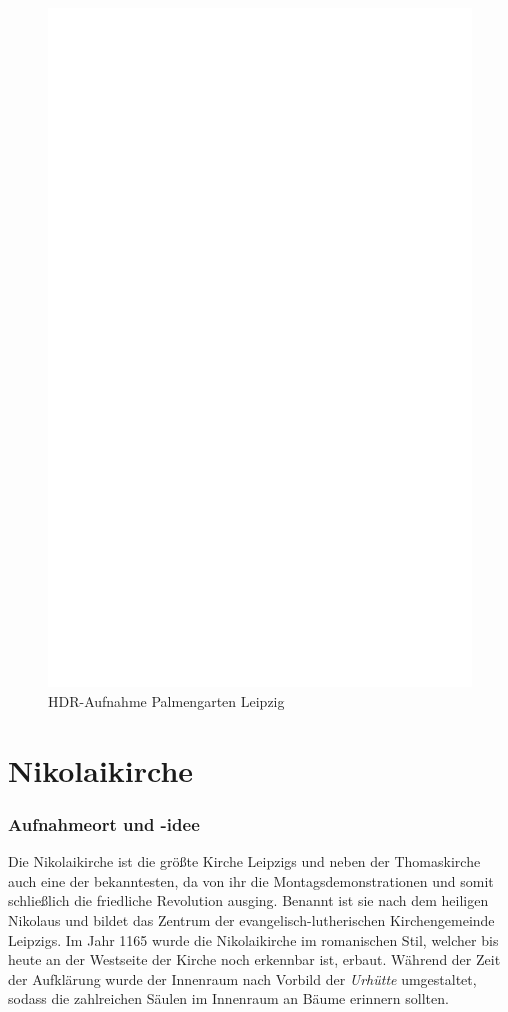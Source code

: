 \documentclass[liststotoc,bibtotoc,fontsize=14pt,]{scrreprt}
\begin{document}
\newpage
\begin{figure}[h]
	\includegraphics[width=\linewidth]{img/ph.jpg}
	\caption{HDR-Aufnahme Palmengarten Leipzig}
\end{figure}

\section{Nikolaikirche}
\label{sec:nikolai}
\subsubsection{Aufnahmeort und -idee}
Die Nikolaikirche ist die größte Kirche Leipzigs und neben der Thomaskirche auch eine der bekanntesten, da von ihr die Montagsdemonstrationen und somit schließlich die friedliche Revolution ausging. Benannt ist sie nach dem heiligen Nikolaus und bildet das Zentrum der evangelisch-lutherischen Kirchengemeinde Leipzigs. Im Jahr 1165 wurde die Nikolaikirche im romanischen Stil, welcher bis heute an der Westseite der Kirche noch erkennbar ist, erbaut. Während der Zeit der Aufklärung wurde der Innenraum nach Vorbild der \textit{Urhütte} umgestaltet, sodass die zahlreichen Säulen im Innenraum an Bäume erinnern sollten. 
\end{document}
